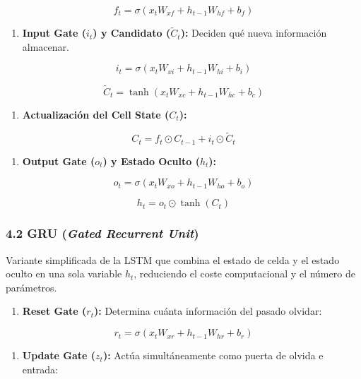 \documentclass[11pt,oneside]{article}
\begin{document}
\[f_t = \sigma\left(x_t W_{xf} + h_{t-1} W_{hf} + b_f\right)\]

\begin{enumerate}

\item \textbf{Input Gate (\(i_t\)) y Candidato (\(\tilde{C}_t\)):} Deciden qué nueva información almacenar.

\end{enumerate}

\[i_t = \sigma\left(x_t W_{xi} + h_{t-1} W_{hi} + b_i\right)\]

\[\tilde{C}_t = \tanh\left(x_t W_{xc} + h_{t-1} W_{hc} + b_c\right)\]

\begin{enumerate}

\item \textbf{Actualización del Cell State (\(C_t\)):}

\end{enumerate}

\[C_t = f_t \odot C_{t-1} + i_t \odot \tilde{C}_t\]

\begin{enumerate}

\item \textbf{Output Gate (\(o_t\)) y Estado Oculto (\(h_t\)):}

\end{enumerate}

\[o_t = \sigma\left(x_t W_{xo} + h_{t-1} W_{ho} + b_o\right)\]

\[h_t = o_t \odot \tanh(C_t)\]

\subsubsection{4.2 GRU (\emph{Gated Recurrent Unit})}

Variante simplificada de la LSTM que combina el estado de celda y el estado oculto en una sola variable \(h_t\), reduciendo el coste computacional y el número de parámetros.

\begin{enumerate}

\item \textbf{Reset Gate (\(r_t\)):} Determina cuánta información del pasado olvidar:

\end{enumerate}

\[r_t = \sigma\left(x_t W_{xr} + h_{t-1} W_{hr} + b_r\right)\]

\begin{enumerate}

\item \textbf{Update Gate (\(z_t\)):} Actúa simultáneamente como puerta de olvida e entrada:

\end{enumerate}
\end{document}
